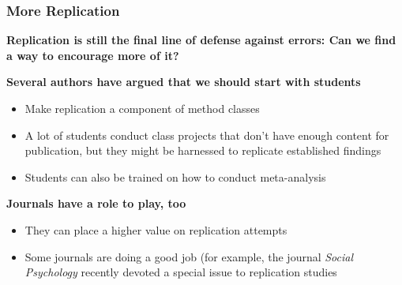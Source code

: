 \documentclass[10pt, block=fill]{beamer}
\begin{document}
\begin{frame}
    \frametitle{More Replication}
    
    {\large \textbf{Replication is still the final line of defense against errors: Can we find a way to encourage more of it?} }
    
    \vspace{0.1in}
    
    \textbf{Several authors have argued that we should start with students}
    \begin{itemize}
        \item Make replication a component of method classes
        \item A lot of students conduct class projects that don't have enough content for publication, but they might be harnessed to replicate established findings
        \item Students can also be trained on how to conduct meta-analysis
    \end{itemize}
    
    \vspace{0.1in}
    
    \textbf{Journals have a role to play, too}
        \begin{itemize}
            \item They can place a higher value on replication attempts
            \item Some journals are doing a good job (for example, the journal \textit{Social Psychology} recently devoted a special issue to replication studies
        \end{itemize}

\end{frame}
 
\end{document}
